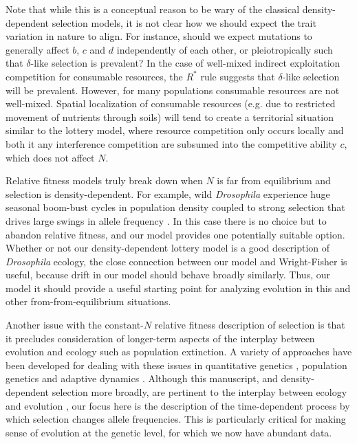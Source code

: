 \documentclass[11pt]{article}
\begin{document}
Note that while this is a conceptual reason to be wary of the classical density-dependent selection models, it is not clear how we should expect the trait variation in nature to align. For instance, should we expect mutations to generally affect $b$, $c$ and $d$ independently of each other, or pleiotropically such that $\delta$-like selection is prevalent? In the case of well-mixed indirect exploitation competition for consumable resources, the $R^*$ rule  suggests that $\delta$-like selection will be prevalent. However, for many populations consumable resources are not well-mixed. Spatial localization of consumable resources (e.g. due to restricted movement of  nutrients through soils) will tend to create a territorial situation similar to the lottery model, where resource competition only occurs locally and both it any interference competition are subsumed into the competitive ability $c$, which does not affect $N$. 

Relative fitness models truly break down when $N$ is far from equilibrium and selection is density-dependent. For example, wild \textit{Drosophila} experience huge seasonal boom-bust cycles in population density coupled to strong selection that drives large swings in allele frequency \citep{bergland_14}. In this case there is no choice but to abandon relative fitness, and our model provides one potentially suitable option. Whether or not our density-dependent lottery model is a good description of \textit{Drosophila} ecology, the close connection between our model and Wright-Fisher is useful, because drift in our model should behave broadly similarly. Thus, our model it should provide a useful starting point for analyzing evolution in this and other from-from-equilibrium situations.

Another issue with the constant-$N$ relative fitness description of selection is that it precludes consideration of longer-term aspects of the interplay between evolution and ecology such as population extinction. A variety of approaches have been developed for dealing with these issues in quantitative genetics \citep{burger1995evolution,engen_2013}, population genetics \citep{bertram2017predicting} and adaptive dynamics \citep{ferriere2013eco,dieckmann2004adaptive}. Although this manuscript, and density-dependent selection more broadly, are pertinent to the interplay between ecology and evolution \citep{travis_2013}, our focus here is the description of the time-dependent process by which selection changes allele frequencies. This is particularly critical for making sense of evolution at the genetic level, for which we now have abundant data. 
\end{document}
